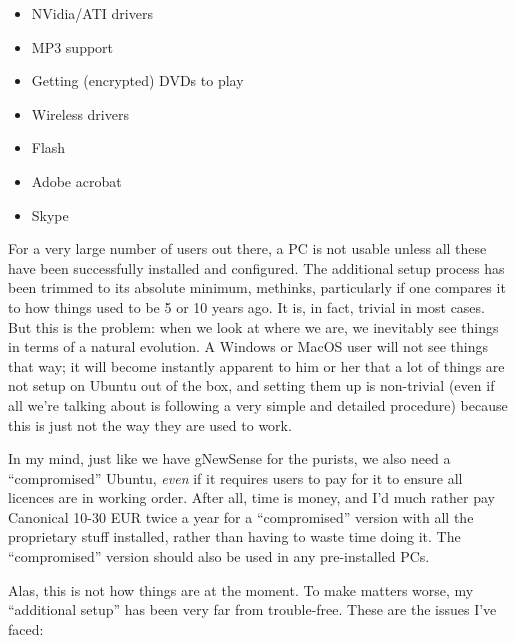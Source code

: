 \documentclass{memoir}
\begin{document}
\begin{itemize}
\item NVidia/ATI drivers
\item MP3 support
\item Getting (encrypted) DVDs to play
\item Wireless drivers
\item Flash
\item Adobe acrobat
\item Skype
\end{itemize}

For a very large number of users out there, a PC is not usable unless
all these have been successfully installed and configured. The
additional setup process has been trimmed to its absolute minimum,
methinks, particularly if one compares it to how things used to be 5
or 10 years ago. It is, in fact, trivial in most cases. But this is
the problem: when we look at where we are, we inevitably see things in
terms of a natural evolution. A Windows or MacOS user will not see
things that way; it will become instantly apparent to him or her that
a lot of things are not setup on Ubuntu out of the box, and setting
them up is non-trivial (even if all we're talking about is following a
very simple and detailed procedure) because this is just not the way
they are used to work.

In my mind, just like we have gNewSense for the purists, we also need
a ``compromised'' Ubuntu, \emph{even} if it requires users to pay for
it to ensure all licences are in working order. After all, time is
money, and I'd much rather pay Canonical 10-30 EUR twice a year for a
``compromised'' version with all the proprietary stuff installed,
rather than having to waste time doing it. The ``compromised'' version
should also be used in any pre-installed PCs.

Alas, this is not how things are at the moment. To make matters worse,
my ``additional setup'' has been very far from trouble-free. These are
the issues I've faced:
\end{document}
